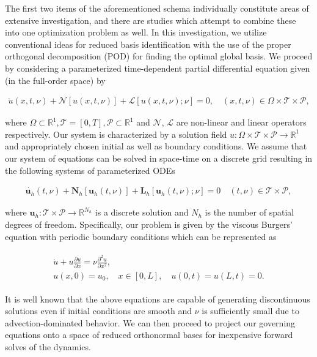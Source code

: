 \documentclass[preprint,12pt]{elsarticle}
\begin{document}
The first two items of the aforementioned schema individually constitute areas of extensive investigation, and there are studies which attempt to combine these into one optimization problem as well. In this investigation, we utilize conventional ideas for reduced basis identification with the use of the proper orthogonal decomposition (POD) for finding the optimal global basis. We proceed by considering a parameterized time-dependent partial differential equation given (in the full-order space) by
\begin{linenomath*}
\begin{align}
\label{gen1}
\dot{u}(x,t,\nu) + \mathcal{N}[u(x,t,\nu)] + \mathcal{L}[u(x,t,\nu); \nu] = 0, \quad (x,t,\nu) \in \Omega \times \mathcal{T} \times \mathcal{P},
\end{align}
\end{linenomath*}
where $\Omega \subset \mathbb{R}^1, \mathcal{T} = [0,T], \mathcal{P} \subset \mathbb{R}^1$ and $\mathcal{N}$, $\mathcal{L}$ are non-linear and linear operators respectively. Our system is characterized by a solution field $u : \Omega \times \mathcal{T} \times \mathcal{P} \rightarrow \mathbb{R}^1$ and appropriately chosen initial as well as boundary conditions.  We assume that our system of equations can be solved in space-time on a discrete grid resulting in the following systems of parameterized ODEs
\begin{linenomath*}
\begin{align}
\dot{\mathbf{u}_h}(t,\nu) + \mathbf{N}_{h}[\mathbf{u}_h(t,\nu)] + \mathbf{L}_h[\mathbf{u}_h(t,\nu); \nu] = 0  \quad(t,\nu) \in \mathcal{T} \times \mathcal{P},
\end{align}
\end{linenomath*}
where $\mathbf{u}_h : \mathcal{T} \times \mathcal{P} \rightarrow \mathbb{R}^{N_h}$ is a discrete solution and $N_h$ is the number of spatial degrees of freedom. Specifically, our problem is given by the viscous Burgers' equation with periodic boundary conditions which can be represented as
\begin{linenomath*}
\begin{align}
\begin{gathered}
\label{gen3}
\dot{u} + u\frac{\partial u}{\partial x} = \nu \frac{\partial^2 u}{\partial x^2}, \\
u(x,0) = u_0, \quad x \in [0,L], \quad u(0,t) = u(L,t) = 0.
\end{gathered}
\end{align}
\end{linenomath*}
It is well known that the above equations are capable of generating discontinuous solutions even if initial conditions are smooth and $\nu$ is sufficiently small due to advection-dominated behavior. We can then proceed to project our governing equations onto a space of reduced orthonormal bases for inexpensive forward solves of the dynamics. 
\end{document}
